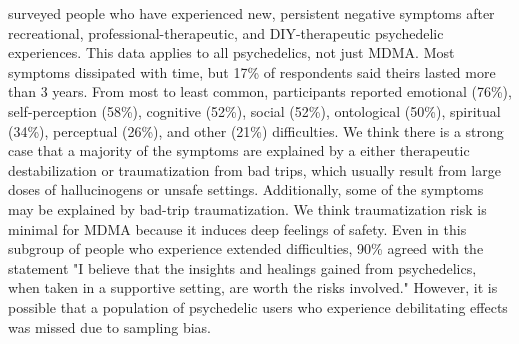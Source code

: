 \documentclass[12pt,letterpaper]{article}
\begin{document}
\textcite{evans2023extended} surveyed people who have experienced new, persistent negative symptoms after recreational, professional-therapeutic, and DIY-therapeutic psychedelic experiences. This data applies to all psychedelics, not just MDMA. Most symptoms dissipated with time, but 17\% of respondents said theirs lasted more than 3 years. From most to least common, participants reported emotional (76\%), self-perception (58\%), cognitive (52\%), social (52\%), ontological (50\%), spiritual (34\%), perceptual (26\%), and other (21\%) difficulties. We think there is a strong case that a majority of the symptoms are explained by a either therapeutic destabilization or traumatization from bad trips, which usually result from large doses of hallucinogens or unsafe settings. Additionally, some of the symptoms may be explained by bad-trip traumatization. We think traumatization risk is minimal for MDMA because it induces deep feelings of safety. Even in this subgroup of people who experience extended difficulties, 90\% agreed with the statement "I believe that the insights and healings gained from psychedelics, when taken in a supportive setting, are worth the risks involved." However, it is possible that a population of psychedelic users who experience debilitating effects was missed due to sampling bias.

\vspace{\baselineskip}
\end{document}
